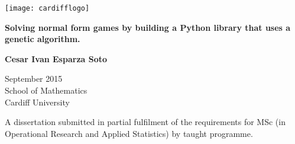 \begin{titlepage}
	\begin{center}
	\vspace*{1cm}
	\thispagestyle{empty}

	\texttt{[image: cardifflogo]}

	\vspace{1.5cm}

	\Huge
	\textbf{Solving normal form games by building a Python library that uses a genetic algorithm.}

	\vspace{1cm}

	\Large
	\textbf{Cesar Ivan Esparza Soto}
	
	\vspace{1.5cm}	

	\Large
	September 2015\\

	School of Mathematics\\

	Cardiff University\\

	\vfill	
	
	\normalsize
	A  dissertation submitted in partial fulfilment of the requirements for MSc (in Operational Research and Applied Statistics) by 			taught programme.
	\end{center}
\end{titlepage}